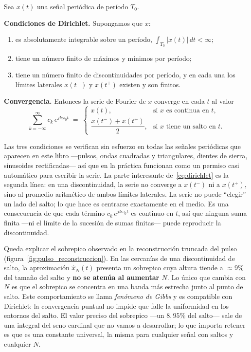 \documentclass[class=book, crop=false]{standalone}
\begin{document}
\begin{resultado}
Sea $x(t)$ una señal periódica de período $T_0$.

\textbf{Condiciones de Dirichlet.} Supongamos que $x$:
\begin{enumerate}[label=(\roman*), leftmargin=*]
    \item es absolutamente integrable sobre un período,
          $\int_{T_0} |x(t)|\,dt < \infty$;
    \item tiene un número finito de máximos y mínimos por período;
    \item tiene un número finito de discontinuidades por período, y
          en cada una los límites laterales $x(t^-)$ y $x(t^+)$
          existen y son finitos.
\end{enumerate}

\medskip
\textbf{Convergencia.} Entonces la serie de Fourier de $x$ converge en cada $t$ al valor
\begin{equation}
    \sum_{k=-\infty}^{\infty} c_k\,e^{jk\omega_0 t}
    \;=\;
    \begin{cases}
        x(t), & \text{si $x$ es continua en $t$}, \\[4pt]
        \dfrac{x(t^-) + x(t^+)}{2}, & \text{si $x$ tiene un salto en $t$}.
    \end{cases}
    \label{eq:dirichlet}
\end{equation}
\end{resultado}

Las tres condiciones se verifican sin esfuerzo en todas las señales
periódicas que aparecen en este libro ---pulsos, ondas cuadradas y
triangulares, dientes de sierra, sinusoides rectificadas--- así que
en la práctica funcionan como un permiso casi automático para
escribir la serie. La parte interesante de~\eqref{eq:dirichlet} es la
segunda línea: en una discontinuidad, la serie no converge a
$x(t^-)$ ni a $x(t^+)$, sino al promedio aritmético de ambos límites
laterales. La serie no puede ``elegir'' un lado del salto; lo que
hace es centrarse exactamente en el medio. Es una consecuencia de
que cada término $c_k\,e^{jk\omega_0 t}$ es continuo en $t$, así que
ninguna suma finita ---ni el límite de la sucesión de sumas
finitas--- puede reproducir la discontinuidad.

Queda explicar el sobrepico observado en la reconstrucción truncada
del pulso (figura~\ref{fig:pulso_reconstruccion}). En las cercanías
de una discontinuidad de salto, la aproximación $\hat{x}_N(t)$
presenta un sobrepico cuya altura tiende a $\approx 9\%$ del tamaño
del salto y \textbf{no se atenúa al aumentar $N$}. Lo único que
cambia con $N$ es que el sobrepico se concentra en una banda más
estrecha junto al punto de salto. Este comportamiento se llama
\emph{fenómeno de Gibbs} y es compatible con Dirichlet: la
convergencia puntual no impide que falle la uniformidad en los
entornos del salto. El valor preciso del sobrepico ---un $8{,}95\%$
del salto--- sale de una integral del seno cardinal que no vamos a
desarrollar; lo que importa retener es que es una constante
universal, la misma para cualquier señal con saltos y cualquier $N$.
\end{document}
